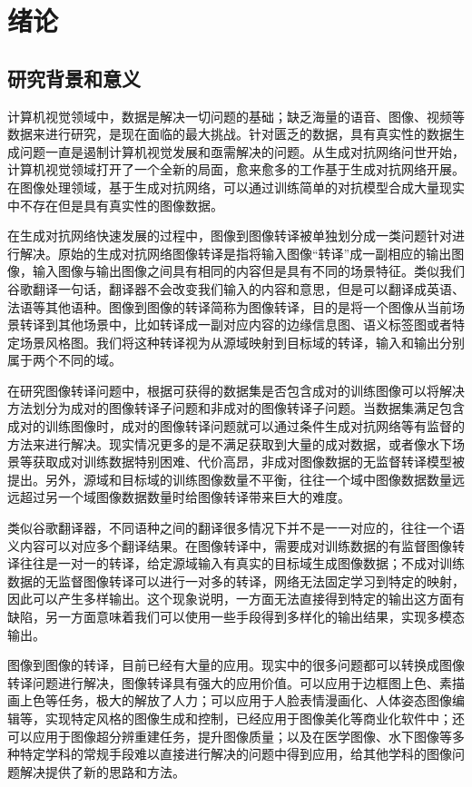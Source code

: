 \chapter{绪论}
\section{研究背景和意义}

计算机视觉领域中，数据是解决一切问题的基础；缺乏海量的语音、图像、视频等数据来进行研究，是现在面临的最大挑战。针对匮乏的数据，具有真实性的数据生成问题一直是遏制计算机视觉发展和亟需解决的问题。从生成对抗网络问世开始，计算机视觉领域打开了一个全新的局面，愈来愈多的工作基于生成对抗网络开展。在图像处理领域，基于生成对抗网络，可以通过训练简单的对抗模型合成大量现实中不存在但是具有真实性的图像数据。

在生成对抗网络快速发展的过程中，图像到图像转译被单独划分成一类问题针对进行解决。原始的生成对抗网络图像转译是指将输入图像“转译”成一副相应的输出图像，输入图像与输出图像之间具有相同的内容但是具有不同的场景特征。类似我们谷歌翻译一句话，翻译器不会改变我们输入的内容和意思，但是可以翻译成英语、法语等其他语种。图像到图像的转译简称为图像转译，目的是将一个图像从当前场景转译到其他场景中，比如转译成一副对应内容的边缘信息图、语义标签图或者特定场景风格图。我们将这种转译视为从源域映射到目标域的转译，输入和输出分别属于两个不同的域。

在研究图像转译问题中，根据可获得的数据集是否包含成对的训练图像可以将解决方法划分为成对的图像转译子问题和非成对的图像转译子问题。当数据集满足包含成对的训练图像时，成对的图像转译问题就可以通过条件生成对抗网络等有监督的方法来进行解决。现实情况更多的是不满足获取到大量的成对数据，或者像水下场景等获取成对训练数据特别困难、代价高昂，非成对图像数据的无监督转译模型被提出。另外，源域和目标域的训练图像数量不平衡，往往一个域中图像数据数量远远超过另一个域图像数据数量时给图像转译带来巨大的难度。

类似谷歌翻译器，不同语种之间的翻译很多情况下并不是一一对应的，往往一个语义内容可以对应多个翻译结果。在图像转译中，需要成对训练数据的有监督图像转译往往是一对一的转译，给定源域输入有真实的目标域生成图像数据；不成对训练数据的无监督图像转译可以进行一对多的转译，网络无法固定学习到特定的映射，因此可以产生多样输出。这个现象说明，一方面无法直接得到特定的输出这方面有缺陷，另一方面意味着我们可以使用一些手段得到多样化的输出结果，实现多模态输出。

图像到图像的转译，目前已经有大量的应用。现实中的很多问题都可以转换成图像转译问题进行解决，图像转译具有强大的应用价值。可以应用于边框图上色、素描画上色等任务，极大的解放了人力；可以应用于人脸表情漫画化、人体姿态图像编辑等，实现特定风格的图像生成和控制，已经应用于图像美化等商业化软件中；还可以应用于图像超分辨重建任务，提升图像质量；以及在医学图像、水下图像等多种特定学科的常规手段难以直接进行解决的问题中得到应用，给其他学科的图像问题解决提供了新的思路和方法。

